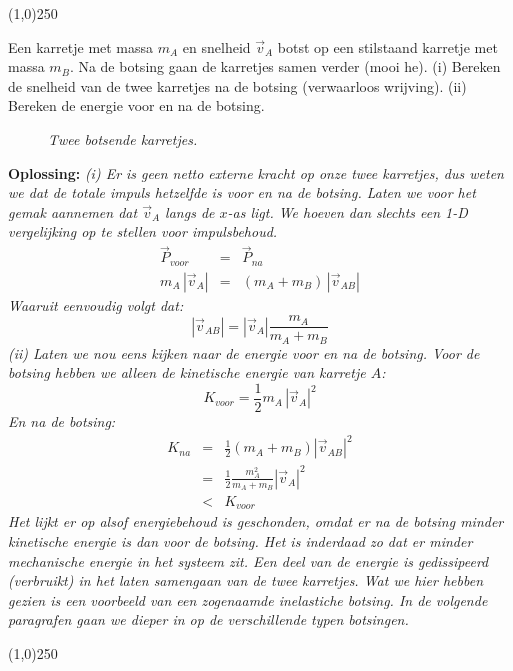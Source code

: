 \begin{center}
\line(1,0){250}
\end{center}
\begin{voorbeeld} \label{ex:bots1}
Een karretje met massa $m_A$ en snelheid $\vec{v}_A$ botst op een stilstaand karretje
met massa $m_B$. Na de botsing gaan de karretjes samen verder (mooi he). (i) Bereken de 
snelheid van de twee karretjes na de botsing (verwaarloos wrijving). (ii) Bereken de energie 
voor en na de botsing.

 \begin{figure}[htbp]
\begin{center}
\caption{{\it Twee botsende karretjes.}}
\label{fig:bots1}
\end{center}
\end{figure} 
{\bf Oplossing: }{\it (i) Er is geen netto externe kracht op onze twee karretjes, dus weten we dat de totale
impuls hetzelfde is voor en na de botsing. Laten we voor het gemak aannemen dat $\vec{v}_A$ langs
de $x$-as ligt. We hoeven dan slechts een 1-D vergelijking op te stellen voor impulsbehoud.
\begin{eqnarray}
\vec{P}_{voor} &= &\vec{P}_{na} \\ 
m_A \, |\vec{v}_A| & =& (m_A + m_B) \,|\vec{v}_{AB}|
\end{eqnarray}
Waaruit eenvoudig volgt dat:
\begin{equation}
|\vec{v}_{AB}| = |\vec{v}_A| \frac{m_A}{m_A+m_B}
\end{equation}
(ii) Laten we nou eens kijken naar de energie voor en na de botsing. Voor de botsing hebben
we alleen de kinetische energie van karretje $A$:
\begin{equation}
K_{voor} = \frac{1}{2}m_A\,|\vec{v}_A|^2
\end{equation}
En na de botsing:
\begin{eqnarray}
K_{na} & = & \frac{1}{2} (m_A+m_B) |\vec{v}_{AB}|^2 \\
& = & \frac{1}{2} \frac{m_A^2}{m_A+m_B} |\vec{v}_A|^2 \\
& < & K_{voor}
\end{eqnarray}
Het lijkt er op alsof energiebehoud is geschonden, omdat er na de botsing minder kinetische energie
is dan voor de botsing. Het is inderdaad zo dat er minder mechanische energie in het systeem zit. Een
deel van de energie is gedissipeerd (verbruikt) in het laten samengaan van de twee karretjes. Wat we
hier hebben gezien is een voorbeeld van een zogenaamde inelastiche botsing. In de volgende paragrafen
gaan we dieper in op de verschillende typen botsingen.
}
\end{voorbeeld}
\begin{center}
\line(1,0){250}
\end{center}

